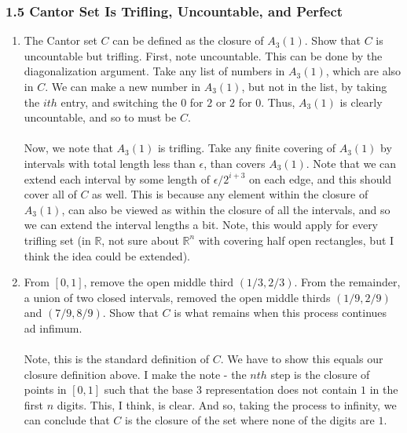\documentclass[12pt,a4paper]{article}
\newcommand{\1}[1]{\mathbbm{1}\left\{ #1 \right\}}
\newcommand{\R}{\mathbb{R}}
\begin{document}
\subsubsection{1.5 Cantor Set Is Trifling, Uncountable, and Perfect}
\begin{enumerate}
	\item The Cantor set $C$ can be defined as the closure of $A_3(1)$. Show that $C$ is uncountable but trifling. First, note uncountable. This can be done by the diagonalization argument. Take any list of numbers in $A_3(1)$, which are also in $C$. We can make a new number in $A_3(1)$, but not in the list, by taking the $ith$ entry, and switching the $0$ for $2$ or $2$ for $0$. Thus, $A_3(1)$ is clearly uncountable, and so to must be $C$.
	\\\\
	Now, we note that $A_3(1)$ is trifling. Take any finite covering of $A_3(1)$ by intervals with total length less than $\epsilon$, than covers $A_3(1)$. Note that we can extend each interval by some length of $\epsilon/2^{i + 3}$ on each edge, and this should cover all of $C$ as well. This is because any element within the closure of $A_3(1)$, can also be viewed as within the closure of all the intervals, and so we can extend the interval lengths a bit. Note, this would apply for every trifling set (in $\R$, not sure about $\R^n$ with covering half open rectangles, but I think the idea could be extended).
	
	\item From $[0,1]$, remove the open middle third $(1/3,2/3)$. From the remainder, a union of two closed intervals, removed the open middle thirds $(1/9,2/9)$ and $(7/9,8/9)$. Show that $C$ is what remains when this process continues ad infimum.
	\\\\
	Note, this is the standard definition of $C$. We have to show this equals our closure definition above. I make the note - the $nth$ step is the closure of points in $[0,1]$ such that the base 3 representation does not contain $1$ in the first $n$ digits. This, I think, is clear. And so, taking the process to infinity, we can conclude that $C$ is the closure of the set where none of the digits are $1$.
	

\end{enumerate}
\end{document}
